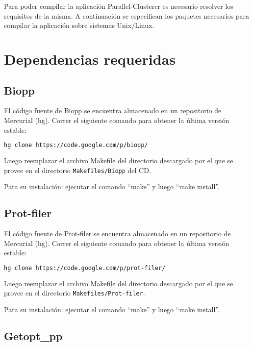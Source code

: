 \documentclass[12pt,spanish,a4paper]{report}
\begin{document}
Para poder compilar la aplicación Parallel-Clusterer es necesario resolver los requisitos de la misma. A continuación se especifican los paquetes necesarios para compilar la aplicación sobre sistemas Unix/Linux.

\section{Dependencias requeridas}

\subsection{Biopp}

El código fuente de Biopp se encuentra almacenado en un repositorio de Mercurial (hg). Correr el siguiente comando para obtener la última versión estable:

\begin{lstlisting}[frame=shadowbox, language=bash, basicstyle=\footnotesize, backgroundcolor=\color{gris}]
 hg clone https://code.google.com/p/biopp/
\end{lstlisting}

Luego reemplazar el archivo Makefile del directorio descargado por el que se provee en el directorio \texttt{Makefiles/Biopp} del CD.

Para su instalación: ejecutar el comando ``make'' y luego ``make install''.

\subsection{Prot-filer}

El código fuente de Prot-filer se encuentra almacenado en un repositorio de Mercurial (hg). Correr el siguiente comando para obtener la última versión estable:

\begin{lstlisting}[frame=shadowbox, language=bash, basicstyle=\footnotesize, backgroundcolor=\color{gris}]
hg clone https://code.google.com/p/prot-filer/
\end{lstlisting}

Luego reemplazar el archivo Makefile del directorio descargado por el que se provee en el directorio \texttt{Makefiles/Prot-filer}.

Para su instalación: ejecutar el comando ``make'' y luego ``make install''.

\subsection{Getopt\_pp}
\end{document}
